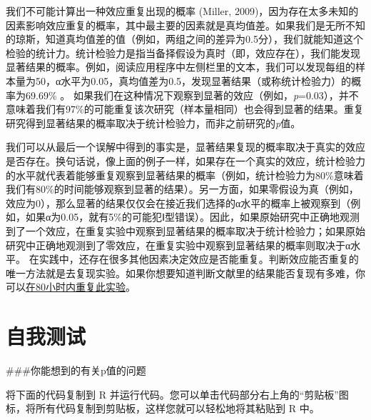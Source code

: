 \documentclass[
  letterpaper,
  DIV=11,
  numbers=noendperiod]{scrreprt}
\begin{document}
我们不可能计算出一种效应重复出现的概率 (Miller,
2009)，因为存在太多未知的因素影响效应重复的概率，其中最主要的因素就是真均值差。如果我们是无所不知的琼斯，知道真均值差的值（例如，两组之间的差异为0.5分），我们就能知道这个检验的统计力。统计检验力是指当备择假设为真时（即，效应存在），我们能发现显著结果的概率。例如，阅读应用程序中左侧栏里的文本，我们可以发现每组的样本量为50，α水平为0.05，真均值差为0.5，发现显著结果（或称统计检验力）的概率为69.69\%
。
如果我们在这种情况下观察到显著的效应（例如，\emph{p}=0.03），并不意味着我们有97\%的可能重复该次研究（样本量相同）也会得到显著的结果。重复研究得到显著结果的概率取决于统计检验力，而非之前研究的\emph{p}值。

我们可以从最后一个误解中得到的事实是，显著结果复现的概率取决于真实的效应是否存在。换句话说，像上面的例子一样，如果存在一个真实的效应，统计检验力的水平就代表着能够重复观察到显著结果的概率（例如，统计检验力为80\%意味着我们有80\%的时间能够观察到显著的结果）。另一方面，如果零假设为真（例如，效应为0），那么显著的结果仅仅会在接近我们选择的α水平的概率上被观察到（例如，如果α为0.05，就有5\%的可能犯Ⅰ型错误）。因此，如果原始研究中正确地观测到了一个效应，在重复实验中观察到显著结果的概率取决于统计检验力；如果原始研究中正确地观测到了零效应，在重复实验中观察到显著结果的概率则取决于α水平。
在实践中，还存在很多其他因素决定效应是否能重复。判断效应能否重复的唯一方法就是去复现实验。如果你想要知道判断文献里的结果能否复现有多难，你可以\href{https://80000hours.org/psychology-replication-quiz/}{在80小时内重复此实验}。

\hypertarget{ux81eaux6211ux6d4bux8bd5}{%
\section{自我测试}\label{ux81eaux6211ux6d4bux8bd5}}

\#\#\#你能想到的有关p值的问题

将下面的代码复制到 R
并运行代码。您可以单击代码部分右上角的``剪贴板''图标，将所有代码复制到剪贴板，这样您就可以轻松地将其粘贴到
R 中。
\end{document}
